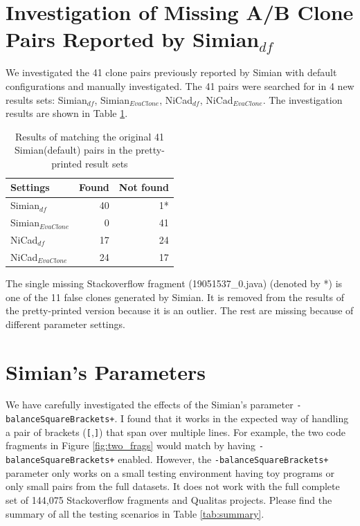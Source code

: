 \documentclass{sig-alternate-05-2015}
\begin{document}
\section{Investigation of Missing A/B Clone Pairs Reported by Simian$_{df}$}
We investigated the 41 clone pairs previously reported by Simian with default configurations and manually investigated. The 41 pairs were searched for in 4 new results sets: Simian$_{df}$, Simian$_{\mathrm{\textit{EvaClone}}}$, NiCad$_{df}$, NiCad$_{\mathrm{\textit{EvaClone}}}$. The investigation results are shown in Table \ref{tab:search}.

\begin{table}
	\centering
	\caption{Results of matching the original 41 Simian(default) pairs in the pretty-printed result sets}
	\label{tab:search}
	\begin{tabular}{l|r|r}
		\hline 
		Settings & Found & Not found \\ 
		\hline 
		Simian$_{df}$  &  40 & 1* \\ 
		\hline 
		Simian$_{\mathrm{\textit{EvaClone}}}$ & 0 & 41  \\ 
		\hline 
		NiCad$_{df}$  & 17 & 24 \\ 
		\hline 
		NiCad$_{\mathrm{\textit{EvaClone}}}$ &  24 & 17 \\ 
		\hline 
	\end{tabular} 
\end{table}

The single missing Stackoverflow fragment (19051537\_0.java) (denoted by *) is one of the 11 false clones generated by Simian. It is removed from the results of the pretty-printed version because it is an outlier. The rest are missing because of different parameter settings.

\section{Simian's Parameters}

We have carefully investigated the effects of the Simian's parameter \texttt{-balanceSquareBrackets+}. I found that it works in the expected way of handling a pair of brackets (\texttt{[},\texttt{]}) that span over multiple lines. For example, the two code fragments in Figure \ref{fig:two_frags} would match by having \texttt{-balanceSquareBrackets+} enabled. However, the \texttt{-balanceSquareBrackets+} parameter only works on a small testing environment having toy programs or only small pairs from the full datasets. It does not work with the full complete set of 144,075 Stackoverflow fragments and Qualitas projects. Please find the summary of all the testing scenarios in Table \ref{tab:summary}. %
\end{document}
